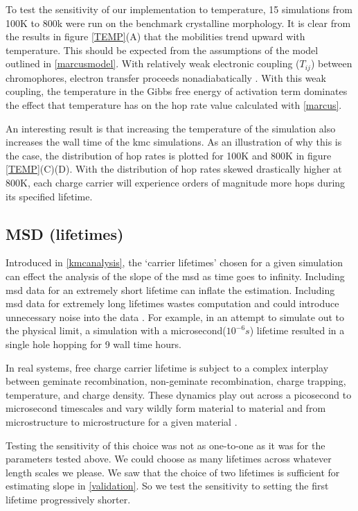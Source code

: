 To test the sensitivity of our implementation to
temperature, 15  simulations from 100K to 800k were run on the benchmark  crystalline morphology. It is clear from the results in figure \ref{TEMP}(A) that the mobilities trend upward with temperature.
This should be expected from the assumptions of the model outlined in \autoref{marcusmodel}. 
With relatively weak electronic coupling ($T_{ij}$) between chromophores, electron transfer proceeds nonadiabatically \cite{clarke2010}. With this weak coupling, the temperature in the Gibbs free energy of activation term
dominates the effect that temperature has on the hop rate value calculated with \autoref{marcus}.

An interesting result is that increasing the temperature of the 
simulation also increases the wall time of the \gls{kmc} simulations.
As an illustration of why this is the case, the distribution of hop
rates is plotted for 100K and 800K in figure \ref{TEMP}(C)(D). With the distribution of hop rates skewed
drastically higher at 800K, each charge carrier will experience orders of
magnitude more hops during its specified lifetime. 

\subsection{MSD (lifetimes)}

Introduced in \autoref{kmcanalysis}, the `carrier lifetimes' chosen for a given
simulation can effect the analysis of the slope of the \gls{msd} as time goes
to infinity. 
Including \gls{msd} data for an extremely short lifetime can inflate
the estimation. Including \gls{msd} data for extremely long lifetimes wastes computation and could introduce unnecessary noise into the data \cite{Maginn2018}. 
For example, in an attempt to simulate out to the physical limit, a
simulation with a microsecond($10^{-6}s$) lifetime resulted in a single hole hopping for 9 wall time hours.

In real systems, free charge
carrier lifetime is subject to a complex interplay between geminate recombination, non-geminate recombination,
charge trapping, temperature, and charge density. These dynamics play out across a picosecond to microsecond
timescales and vary wildly form material to material and from microstructure to microstructure for a
given material \cite{Laquai2015}.

Testing the sensitivity of this choice was not as one-to-one as it was for the
parameters tested above. We could choose as many lifetimes across whatever
length scales we please. We saw that the choice of two lifetimes is sufficient
for estimating slope in \autoref{validation}. So we test the sensitivity to
setting the first lifetime progressively shorter. 

